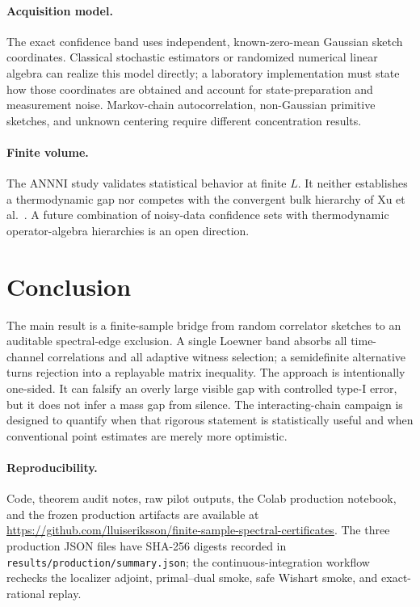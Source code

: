 \documentclass[11pt]{article}
\begin{document}
\paragraph{Acquisition model.}
The exact confidence band uses independent, known-zero-mean Gaussian sketch
coordinates.  Classical stochastic estimators or randomized numerical linear
algebra can realize this model directly; a laboratory implementation must state
how those coordinates are obtained and account for state-preparation and
measurement noise.  Markov-chain autocorrelation, non-Gaussian primitive
sketches, and unknown centering require different concentration results.

\paragraph{Finite volume.}
The ANNNI study validates statistical behavior at finite $L$.  It neither
establishes a thermodynamic gap nor competes with the convergent bulk hierarchy
of Xu et al.~\cite{Xu2026}.  A future combination of noisy-data confidence sets
with thermodynamic operator-algebra hierarchies is an open direction.

\section{Conclusion}

The main result is a finite-sample bridge from random correlator sketches to an
auditable spectral-edge exclusion.  A single Loewner band absorbs all
time-channel correlations and all adaptive witness selection; a semidefinite
alternative turns rejection into a replayable matrix inequality.  The approach
is intentionally one-sided.  It can falsify an overly large visible gap with
controlled type-I error, but it does not infer a mass gap from silence.  The
interacting-chain campaign is designed to quantify when that rigorous statement
is statistically useful and when conventional point estimates are merely more
optimistic.

\paragraph{Reproducibility.}
Code, theorem audit notes, raw pilot outputs, the Colab production notebook, and
the frozen production artifacts are available at
\url{https://github.com/lluiseriksson/finite-sample-spectral-certificates}.
The three production JSON files have SHA-256 digests recorded in
\texttt{results/production/summary.json}; the continuous-integration workflow
rechecks the localizer adjoint, primal--dual smoke, safe Wishart smoke, and
exact-rational replay.
\end{document}
